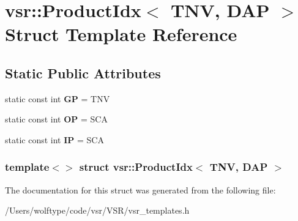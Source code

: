 \hypertarget{structvsr_1_1_product_idx_3_01_t_n_v_00_01_d_a_p_01_4}{\section{vsr\-:\-:Product\-Idx$<$ T\-N\-V, D\-A\-P $>$ Struct Template Reference}
\label{structvsr_1_1_product_idx_3_01_t_n_v_00_01_d_a_p_01_4}
}
\subsection*{Static Public Attributes}
\begin{DoxyCompactItemize}
\item 
\hypertarget{structvsr_1_1_product_idx_3_01_t_n_v_00_01_d_a_p_01_4_a9e2c66f865c8892458658af305e99ff8}{static const int {\bfseries G\-P} = T\-N\-V}\label{structvsr_1_1_product_idx_3_01_t_n_v_00_01_d_a_p_01_4_a9e2c66f865c8892458658af305e99ff8}

\item 
\hypertarget{structvsr_1_1_product_idx_3_01_t_n_v_00_01_d_a_p_01_4_a432048563a48aafdfe62a2882256c6fe}{static const int {\bfseries O\-P} = S\-C\-A}\label{structvsr_1_1_product_idx_3_01_t_n_v_00_01_d_a_p_01_4_a432048563a48aafdfe62a2882256c6fe}

\item 
\hypertarget{structvsr_1_1_product_idx_3_01_t_n_v_00_01_d_a_p_01_4_a344023ba181373752f4bedb33a979935}{static const int {\bfseries I\-P} = S\-C\-A}\label{structvsr_1_1_product_idx_3_01_t_n_v_00_01_d_a_p_01_4_a344023ba181373752f4bedb33a979935}

\end{DoxyCompactItemize}
\subsubsection*{template$<$$>$ struct vsr\-::\-Product\-Idx$<$ T\-N\-V, D\-A\-P $>$}



The documentation for this struct was generated from the following file\-:\begin{DoxyCompactItemize}
\item 
/\-Users/wolftype/code/vsr/\-V\-S\-R/vsr\-\_\-templates.\-h\end{DoxyCompactItemize}
